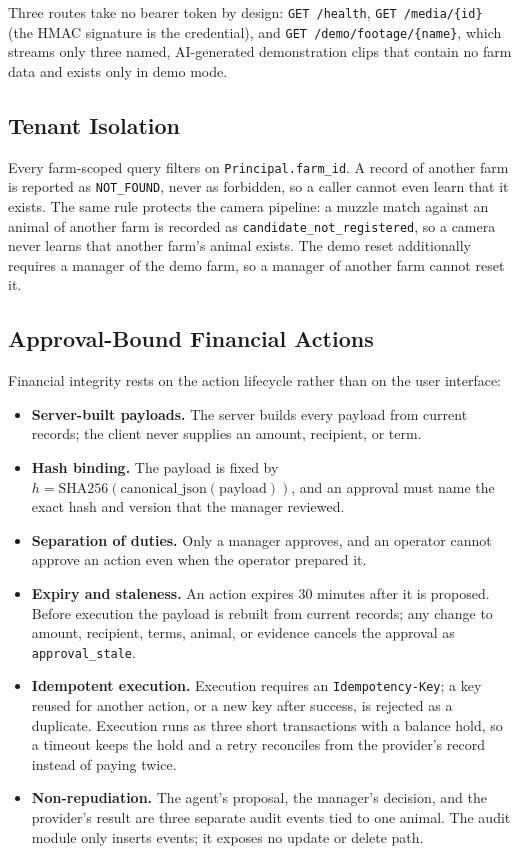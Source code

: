 \documentclass[11pt,letterpaper]{article}
\begin{document}
Three routes take no bearer token by design: \texttt{GET /health}, \texttt{GET /media/\{id\}} (the HMAC signature is the credential), and \texttt{GET /demo/footage/\{name\}}, which streams only three named, AI-generated demonstration clips that contain no farm data and exists only in demo mode.

\subsection{Tenant Isolation}

Every farm-scoped query filters on \texttt{Principal.farm\_id}. A record of another farm is reported as \texttt{NOT\_FOUND}, never as forbidden, so a caller cannot even learn that it exists. The same rule protects the camera pipeline: a muzzle match against an animal of another farm is recorded as \texttt{candidate\_not\_registered}, so a camera never learns that another farm's animal exists. The demo reset additionally requires a manager of the demo farm, so a manager of another farm cannot reset it.

\subsection{Approval-Bound Financial Actions}

Financial integrity rests on the action lifecycle rather than on the user interface:
\begin{itemize}
\item \textbf{Server-built payloads.} The server builds every payload from current records; the client never supplies an amount, recipient, or term.
\item \textbf{Hash binding.} The payload is fixed by $h = \mathrm{SHA256}(\mathrm{canonical\_json}(\text{payload}))$, and an approval must name the exact hash and version that the manager reviewed.
\item \textbf{Separation of duties.} Only a manager approves, and an operator cannot approve an action even when the operator prepared it.
\item \textbf{Expiry and staleness.} An action expires 30 minutes after it is proposed. Before execution the payload is rebuilt from current records; any change to amount, recipient, terms, animal, or evidence cancels the approval as \texttt{approval\_stale}.
\item \textbf{Idempotent execution.} Execution requires an \texttt{Idempotency-Key}; a key reused for another action, or a new key after success, is rejected as a duplicate. Execution runs as three short transactions with a balance hold, so a timeout keeps the hold and a retry reconciles from the provider's record instead of paying twice.
\item \textbf{Non-repudiation.} The agent's proposal, the manager's decision, and the provider's result are three separate audit events tied to one animal. The audit module only inserts events; it exposes no update or delete path.
\end{itemize}
\end{document}
